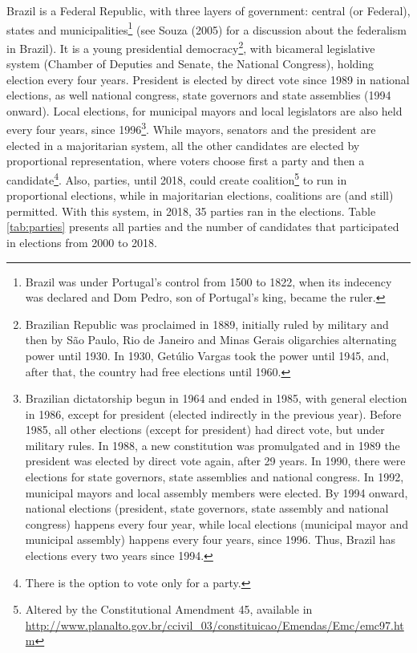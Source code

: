 \documentclass[
  12pt,
]{article}
\begin{document}
Brazil is a Federal Republic, with three layers of government: central
(or Federal), states and municipalities\footnote{Brazil was under
  Portugal's control from 1500 to 1822, when its indecency was declared
  and Dom Pedro, son of Portugal's king, became the ruler.} (see Souza
(2005) for a discussion about the federalism in Brazil). It is a young
presidential democracy\footnote{Brazilian Republic was proclaimed in
  1889, initially ruled by military and then by São Paulo, Rio de
  Janeiro and Minas Gerais oligarchies alternating power until 1930. In
  1930, Getúlio Vargas took the power until 1945, and, after that, the
  country had free elections until 1960.}, with bicameral legislative
system (Chamber of Deputies and Senate, the National Congress), holding
election every four years. President is elected by direct vote since
1989 in national elections, as well national congress, state governors
and state assemblies (1994 onward). Local elections, for municipal
mayors and local legislators are also held every four years, since
1996\footnote{Brazilian dictatorship begun in 1964 and ended in 1985,
  with general election in 1986, except for president (elected
  indirectly in the previous year). Before 1985, all other elections
  (except for president) had direct vote, but under military rules. In
  1988, a new constitution was promulgated and in 1989 the president was
  elected by direct vote again, after 29 years. In 1990, there were
  elections for state governors, state assemblies and national congress.
  In 1992, municipal mayors and local assembly members were elected. By
  1994 onward, national elections (president, state governors, state
  assembly and national congress) happens every four year, while local
  elections (municipal mayor and municipal assembly) happens every four
  years, since 1996. Thus, Brazil has elections every two years since
  1994.}. While mayors, senators and the president are elected in a
majoritarian system, all the other candidates are elected by
proportional representation, where voters choose first a party and then
a candidate\footnote{There is the option to vote only for a party.}.
Also, parties, until 2018, could create coalition\footnote{Altered by
  the Constitutional Amendment 45, available in
  \url{http://www.planalto.gov.br/ccivil_03/constituicao/Emendas/Emc/emc97.htm}}
to run in proportional elections, while in majoritarian elections,
coalitions are (and still) permitted. With this system, in 2018, 35
parties ran in the elections. Table \ref{tab:parties} presents all
parties and the number of candidates that participated in elections from
2000 to 2018.
\end{document}
